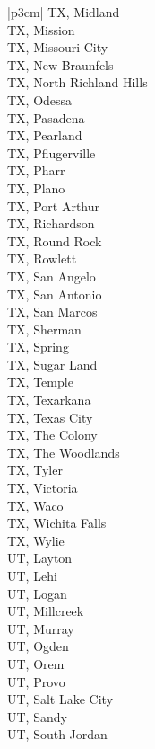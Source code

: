\begin{customLongTable}{ |p{3cm}| }
TX, Midland \\ \hline
TX, Mission \\ \hline
TX, Missouri City \\ \hline
TX, New Braunfels \\ \hline
TX, North Richland Hills \\ \hline
TX, Odessa \\ \hline
TX, Pasadena \\ \hline
TX, Pearland \\ \hline
TX, Pflugerville \\ \hline
TX, Pharr \\ \hline
TX, Plano \\ \hline
TX, Port Arthur \\ \hline
TX, Richardson \\ \hline
TX, Round Rock \\ \hline
TX, Rowlett \\ \hline
TX, San Angelo \\ \hline
TX, San Antonio \\ \hline
TX, San Marcos \\ \hline
TX, Sherman \\ \hline
TX, Spring \\ \hline
TX, Sugar Land \\ \hline
TX, Temple \\ \hline
TX, Texarkana \\ \hline
TX, Texas City \\ \hline
TX, The Colony \\ \hline
TX, The Woodlands \\ \hline
TX, Tyler \\ \hline
TX, Victoria \\ \hline
TX, Waco \\ \hline
TX, Wichita Falls \\ \hline
TX, Wylie \\ \hline
UT, Layton \\ \hline
UT, Lehi \\ \hline
UT, Logan \\ \hline
UT, Millcreek \\ \hline
UT, Murray \\ \hline
UT, Ogden \\ \hline
UT, Orem \\ \hline
UT, Provo \\ \hline
UT, Salt Lake City \\ \hline
UT, Sandy \\ \hline
UT, South Jordan \\ \hline

\end{customLongTable}
